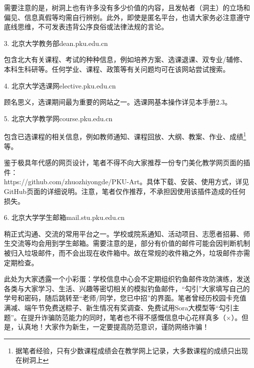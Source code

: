 需要注意的是，树洞上也有许多没有多少价值的内容，且发帖者（洞主）的立场和偏见、信息真假等均需自行辨别。此外，即使是匿名平台，也请大家务必注意遵守底线思维，不可发表违背公序良俗或法律法规的言论。

\vspace{10pt}

3. 北京大学教务部\quad dean.pku.edu.cn

包含北大有关课程、考试的种种信息，例如培养方案、选课退课、双专业/辅修、本科生科研等。任何学业、课程、政策等有关问题均可在该网站尝试搜索。

\vspace{10pt}

4. 北京大学选课网\quad elective.pku.edu.cn

顾名思义，选课期间最为重要的网站之一。选课网基本操作详见本手册2.3。

\vspace{10pt}

5. 北京大学教学网\quad course.pku.edu.cn

包含已选课程的相关信息，例如教师通知、课程回放、大纲、教案、作业、成绩\footnote{据笔者经验，只有少数课程成绩会在教学网上记录，大多数课程的成绩只出现在树洞上}等。

鉴于极具年代感的网页设计，笔者不得不向大家推荐一份专门美化教学网页面的插件：\\https://github.com/zhuozhiyongde/PKU-Art。具体下载、安装、使用方式，详见GitHub页面的详细说明。注意，笔者仅作推荐，不承担因使用该插件造成的任何损失。

\vspace{10pt}

6. 北京大学学生邮箱\quad mail.stu.pku.edu.cn 

稍正式沟通、交流的常用平台之一。学校或院系通知、活动项目、志愿者招募、师生交流等均会用到学生邮箱。需要注意的是，部分有价值的邮件可能会因判断机制被归入垃圾邮件，而不会出现在收件箱中。故在常规的收件箱之外，垃圾邮件亦需定期检查。

\vspace{10pt}

此处为大家透露一个小彩蛋：学校信息中心会不定期组织钓鱼邮件攻防演练，发送各类与大家学习、生活、兴趣等密切相关的模拟钓鱼邮件，“勾引”大家填写自己的学号和密码，随后跳转至“老师/同学，您已中招”的界面。笔者曾经历校园卡充值满减、端午节免费送粽子、新生情况有奖调查、免费试用Sora大模型等“勾引主题”。在提升诈骗防范能力的同时，笔者也不得不感慨信息中心花样真多（$\times$）。但是，认真地！大家作为新生，一定要提高防范意识，谨防网络诈骗！

\vspace{10pt}

